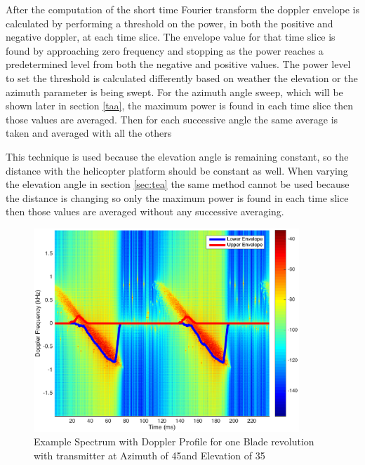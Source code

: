 After the computation of the short time Fourier transform the doppler envelope is calculated by performing a threshold on the power, in both the positive and negative doppler, at each time slice. The envelope value for that time slice is found by approaching zero frequency and stopping as the power reaches a predetermined level from both the negative and positive values. The power level to set the threshold is calculated differently based on weather the elevation or the azimuth parameter is being swept. For the azimuth angle sweep, which will be shown later in section \ref{taa}, the maximum power is found in each time slice then those values are averaged. Then for each successive angle the same average is taken and averaged with all the others 


This technique is used because the elevation angle is remaining constant, so the distance with the helicopter platform should be constant as well. When varying the elevation angle in section \ref{sec:tea} the same method cannot be used because the distance is changing so only the maximum power is found in each time slice then those values are averaged without any successive averaging.

\begin{figure}
	\begin{center}
		\includegraphics[width=10cm]{images/simulation/test_analysis_spectrogram_with_envelope.eps}
		\caption{Example Spectrum with Doppler Profile for one Blade revolution with transmitter at Azimuth of 45\textdegree \space and Elevation of 35\textdegree}
		\label{fig:test_spec_w_doppler_profile}
	\end{center}
\end{figure}

